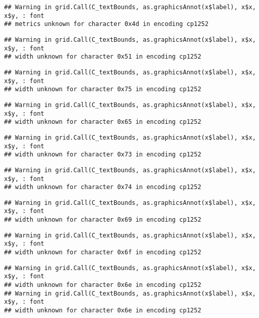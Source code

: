 \documentclass[
]{article}
\begin{document}
\begin{verbatim}
## Warning in grid.Call(C_textBounds, as.graphicsAnnot(x$label), x$x, x$y, : font
## metrics unknown for character 0x4d in encoding cp1252
\end{verbatim}

\begin{verbatim}
## Warning in grid.Call(C_textBounds, as.graphicsAnnot(x$label), x$x, x$y, : font
## width unknown for character 0x51 in encoding cp1252
\end{verbatim}

\begin{verbatim}
## Warning in grid.Call(C_textBounds, as.graphicsAnnot(x$label), x$x, x$y, : font
## width unknown for character 0x75 in encoding cp1252
\end{verbatim}

\begin{verbatim}
## Warning in grid.Call(C_textBounds, as.graphicsAnnot(x$label), x$x, x$y, : font
## width unknown for character 0x65 in encoding cp1252
\end{verbatim}

\begin{verbatim}
## Warning in grid.Call(C_textBounds, as.graphicsAnnot(x$label), x$x, x$y, : font
## width unknown for character 0x73 in encoding cp1252
\end{verbatim}

\begin{verbatim}
## Warning in grid.Call(C_textBounds, as.graphicsAnnot(x$label), x$x, x$y, : font
## width unknown for character 0x74 in encoding cp1252
\end{verbatim}

\begin{verbatim}
## Warning in grid.Call(C_textBounds, as.graphicsAnnot(x$label), x$x, x$y, : font
## width unknown for character 0x69 in encoding cp1252
\end{verbatim}

\begin{verbatim}
## Warning in grid.Call(C_textBounds, as.graphicsAnnot(x$label), x$x, x$y, : font
## width unknown for character 0x6f in encoding cp1252
\end{verbatim}

\begin{verbatim}
## Warning in grid.Call(C_textBounds, as.graphicsAnnot(x$label), x$x, x$y, : font
## width unknown for character 0x6e in encoding cp1252
## Warning in grid.Call(C_textBounds, as.graphicsAnnot(x$label), x$x, x$y, : font
## width unknown for character 0x6e in encoding cp1252
\end{verbatim}
\end{document}
